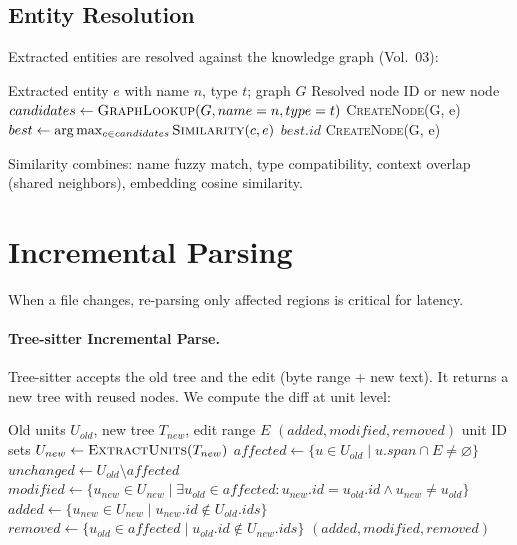 \subsection{Entity Resolution}
\label{sec:parsing:entity-resolution}

Extracted entities are resolved against the knowledge graph (Vol.~03):

\begin{algorithm}[H]
\caption{Entity Resolution}
\label{alg:entity-resolution-parsing}
\begin{algorithmic}[1]
\Require Extracted entity $e$ with name $n$, type $t$; graph $G$
\Ensure Resolved node ID or new node
\State $candidates \gets \textsc{GraphLookup}(G, name=n, type=t)$
  \State \Return \textsc{CreateNode}(G, e) 
\Else
  \State $best \gets \arg\max_{c \in candidates} \textsc{Similarity}(c, e)$
    \State \Return $best.id$ 
  \Else
    \State \Return \textsc{CreateNode}(G, e) 
  \EndIf
\EndIf
\end{algorithmic}
\end{algorithm}

Similarity combines: name fuzzy match, type compatibility, context overlap (shared neighbors), embedding cosine similarity.

\section{Incremental Parsing}
\label{sec:parsing:incremental}

When a file changes, re-parsing only affected regions is critical for latency.

\paragraph{Tree-sitter Incremental Parse.}
Tree-sitter accepts the old tree and the edit (byte range + new text). It returns a new tree with reused nodes. We compute the diff at unit level:

\begin{algorithm}[H]
\caption{Incremental Unit Diff}
\label{alg:incremental-diff}
\begin{algorithmic}[1]
\Require Old units $U_{old}$, new tree $T_{new}$, edit range $E$
\Ensure $(added, modified, removed)$ unit ID sets
\State $U_{new} \gets \textsc{ExtractUnits}(T_{new})$
\State $affected \gets \{ u \in U_{old} \mid u.span \cap E \neq \varnothing \}$
\State $unchanged \gets U_{old} \setminus affected$
\State $modified \gets \{ u_{new} \in U_{new} \mid \exists u_{old} \in affected: u_{new}.id = u_{old}.id \land u_{new} \neq u_{old} \}$
\State $added \gets \{ u_{new} \in U_{new} \mid u_{new}.id \notin U_{old}.ids \}$
\State $removed \gets \{ u_{old} \in affected \mid u_{old}.id \notin U_{new}.ids \}$
\State \Return $(added, modified, removed)$
\end{algorithmic}
\end{algorithm}

